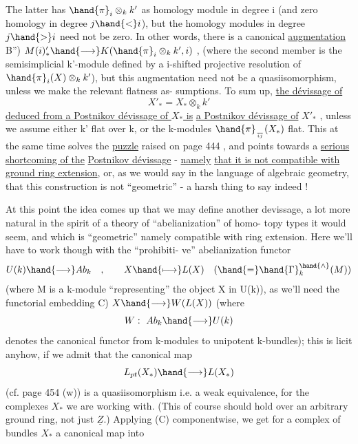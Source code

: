 
The latter has  $\hand{\pi}_i\otimes_k k'$ as homology module in
degree i (and zero homology in degree $j\hand{<}i$), but the homology modules
 
in degree $j\hand{>}i$ need not be zero. In other words, there is a canonical
\uline{augmentation}
B'') \hfill {} $M(i)'_{*}\hand{\longrightarrow} K(\hand{\pi}_i\otimes_k k',i)$ \hfill ,
(where the second member is the semisimplicial  k'-module defined
by a i-shifted projective resolution of $\hand{\pi}_i(X)\otimes_k k'$), but this augmentation
need not be a quasiisomorphism, unless we make the relevant flatness as-%
sumptions. To sum up, \uline{the dévissage of} 
\[ X'_{*} = X_{*}\otimes_k k' \]
\uline{deduced from a Postnikov dévissage of $X_{*}$ is}  \uline{a Postnikov dévissage of}
$X'_{*}$ , unless we assume either k' flat over k, or the k-modules $\hand{\pi}_{\over{i}{j}}(X_{*})$
flat. This at the same time solves the \uline{puzzle} raised on page 444 , and
points towards a \uline{serious shortcoming of the}  \uline{Postnikov dévissage} - \uline{namely}
\uline{that it is not compatible with ground ring extension}, or, as we would
say in the language of algebraic geometry, that this construction is not
``geometric'' - a harsh thing to say indeed !

At this point the idea comes up that we may define another devissage,
a lot more natural in the spirit of a theory of ``abelianization'' of homo-%
topy types it would seem, and which is ``geometric'' namely compatible
with ring extension. Here we'll have to work though with the ``prohibiti-%
ve'' abelianization functor
\[ U(k)\hand{\longrightarrow} Ab_k \quad , \qquad X\hand{\longmapsto} L(X) \quad ( \hand{=} \hand{\Gamma}^{\hand{\wedge}}_k(M) ) \]
(where M is a k-module ``representing'' the object X in U(k)), as 
we'll need the functorial embedding
 C) \hfill $X\hand{\longrightarrow} W(L(X))$ \hfill
(where
\[ W:\ Ab_k\hand{\longrightarrow} U(k) \]
denotes the canonical functor from k-modules to unipotent k-bundles);
this is licit anyhow, if we admit that  the canonical map
\[ L_{pt}(X_{*})\hand{\longrightarrow} L(X_{*}) \]
(cf. page 454 (w)) is a quasiisomorphism i.e. a weak equivalence, for
the complexes $X_{*}$ we are working with. (This of course should hold over
an arbitrary ground ring, not just $\underline{Z}$.) Applying (C) componentwise, we
get for a complex of bundles $X_{*}$ a canonical map into   


